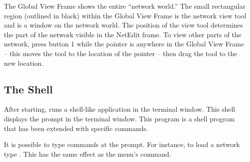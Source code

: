 The Global View Frame shows the entire ``network world.''  The small
rectangular region (outlined in black) within the Global View Frame is the
network view tool and is a window on the network world. The
position of the view tool determines the part of the network 
visible in the NetEdit frame.  To view other parts of the network, press
button 1 while the pointer is anywhere in the Global View Frame -- this 
moves the tool to the location of the pointer --  then drag the tool to the
new location.


\subsection{The \sr{} Shell}
\label{sec:termapp}

After starting, \sr{} runs a shell-like application in the terminal
window. This shell displays the prompt
 in the terminal window.  This program is a
 shell program that has been extended with
\sr{} specific commands.

It is possible to type \tcl{} \sr{} commands at the prompt.  For
instance, to load a network type .  This has the same effect as the 
menu's  command.



